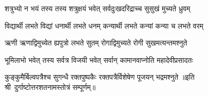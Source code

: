 \twolineshloka
{शत्रुभ्यो न भयं तस्य तस्य शत्रुक्षयं भवेत्}
{सर्वदुःखदरिद्राच्च सुसुखं मुच्यते ध्रुवम्}

\twolineshloka
{विद्यार्थी लभते विद्यां धनार्थी लभते धनम्}
{कन्यार्थी लभते कन्यां कन्या च लभते वरम्}

\twolineshloka
{ऋणी ऋणाद्विमुच्येत ह्यपुत्रो लभते सुतम्}
{रोगाद्विमुच्यते रोगी सुखमत्यन्तमश्नुते}

\twolineshloka
{भूमिलाभो भवेत् तस्य सर्वत्र विजयी भवेत्}
{सर्वान् कामानवाप्नोति महादेवीप्रसादतः}

\twolineshloka
{कुङ्कुमैर्बिल्वपत्रैश्च सुगन्धै रक्तपुष्पकैः}
{रक्तपत्रैर्विशेषेण पूजयन् भद्रमश्नुते}
॥इति श्री~दुर्गाष्टोत्तरशतनामस्तोत्रं सम्पूर्णम्॥
